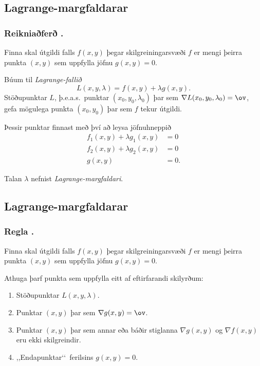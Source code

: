 \subsection{Lagrange-margfaldarar} 

\subsubsection{Reikniaðferð \kaflanr.}
  Finna skal útgildi falls $f(x,y)$ þegar skilgreiningarsvæði $f$ er mengi þeirra punkta $(x,y)$ sem uppfylla jöfnu $g(x,y)=0$.  

\medskip
Búum til {\em Lagrange-fallið}
$$L(x,y,\lambda)=f(x,y)+\lambda g(x,y).$$
Stöðupunktar $L$, þ.e.a.s.~punktar $(x_0,y_0,\lambda_0)$ þar sem $\nabla L(x_0,y_0,\lambda_0)=\ov$, gefa mögulega punkta $(x_0,y_0)$ þar sem $f$ tekur útgildi.

\medskip
Þessir punktar finnast með því að leysa jöfnuhneppið
\begin{align*}
f_1(x,y)+\lambda g_1(x,y)&=0\\
f_2(x,y)+\lambda g_2(x,y)&=0\\
g(x,y)&=0.
\end{align*}

Talan $\lambda$ nefnist \emph{Lagrange-margfaldari}.



\subsection{Lagrange-margfaldarar} 

\subsubsection{Regla \kaflanr.}
Finna skal útgildi falls $f(x,y)$ þegar skilgreiningarsvæði $f$ er mengi þeirra punkta $(x,y)$ sem uppfylla jöfnu $g(x,y)=0$.  

Athuga þarf punkta sem uppfylla eitt af eftirfarandi skilyrðum:

\begin {enumerate}
 \item Stöðupunktar $L(x,y,\lambda)$.
\item Punktar $(x,y)$ þar sem $\nabla g(x,y)=\ov$.
\item  Punktar $(x,y)$ þar sem annar eða báðir stiglanna $\nabla
      g(x,y)$ og $\nabla f(x,y)$ eru ekki skilgreindir. 
\item ,,Endapunktar\lq\lq\ ferilsins $g(x,y)=0$.
 \end {enumerate}






